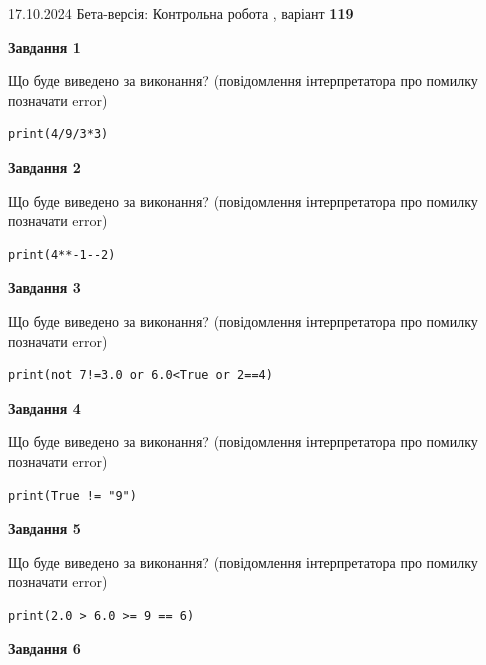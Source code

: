 \documentclass[12pt, ukrainian]{article}
\begin{document}
{\Large{17.10.2024 Бета-версія: Контрольна робота , варіант  \No \textbf { 119 }\par}}
{
\begin {large}
{\begin {center}\textbf{Завдання 1}\end {center}}

Що буде виведено за виконання? (повідомлення інтерпретатора про помилку позначати error)\par
\begin{verbatim}
print(4/9/3*3)
\end{verbatim}

{\begin {center}\textbf{Завдання 2}\end {center}}

Що буде виведено за виконання? (повідомлення інтерпретатора про помилку позначати error)\par
\begin{verbatim}
print(4**-1--2)
\end{verbatim}

{\begin {center}\textbf{Завдання 3}\end {center}}

Що буде виведено за виконання? (повідомлення інтерпретатора про помилку позначати error)\par
\begin{verbatim}
print(not 7!=3.0 or 6.0<True or 2==4)
\end{verbatim}

{\begin {center}\textbf{Завдання 4}\end {center}}

Що буде виведено за виконання? (повідомлення інтерпретатора про помилку позначати error)\par
\begin{verbatim}
print(True != "9")
\end{verbatim}

{\begin {center}\textbf{Завдання 5}\end {center}}

Що буде виведено за виконання? (повідомлення інтерпретатора про помилку позначати error)\par
\begin{verbatim}
print(2.0 > 6.0 >= 9 == 6)
\end{verbatim}

{\begin {center}\textbf{Завдання 6}\end {center}}


\end{large}}
\end{document}
